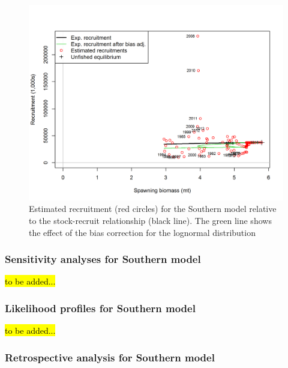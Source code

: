 \documentclass[12pt,]{article}
\begin{document}
\FloatBarrier

\begin{figure}[htbp]
\centering
\includegraphics{r4ss/plots_mod2/SR_curve2.png}
\caption{Estimated recruitment (red circles) for the Southern model
relative to the stock-recruit relationship (black line). The green line
shows the effect of the bias correction for the lognormal distribution
\label{fig:stock_recruit_curve}}
\end{figure}

\FloatBarrier

\newpage

\subsubsection{Sensitivity analyses for Southern
model}\label{sensitivity-analyses-for-southern-model}

\hl{to be added...}

\subsubsection{Likelihood profiles for Southern
model}\label{likelihood-profiles-for-southern-model}

\hl{to be added...}

\subsubsection{Retrospective analysis for Southern
model}\label{retrospective-analysis-for-southern-model}
\end{document}

